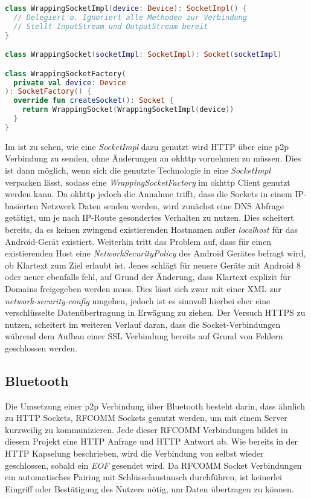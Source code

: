         \begin{lstlisting}[frame=bt, label={lst:android:socketfactory}, language=Kotlin, caption=HTTP Kapselung als SocketFactory (Clientcode in Kotlin)]
class WrappingSocketImpl(device: Device): SocketImpl() {
  // Delegiert o. Ignoriert alle Methoden zur Verbindung
  // Stellt InputStream und OutputStream bereit
}

class WrappingSocket(socketImpl: SocketImpl): Socket(socketImpl)

class WrappingSocketFactory(
  private val device: Device
): SocketFactory() {
  override fun createSocket(): Socket {
    return WrappingSocket(WrappingSocketImpl(device))
  }
}
        \end{lstlisting}
        Im  ist zu sehen, wie eine {\it SocketImpl} dazu genutzt wird HTTP über eine p2p Verbindung zu senden, ohne Änderungen an okhttp vornehmen zu müssen. Dies ist dann möglich, wenn sich die genutzte Technologie in eine {\it SocketImpl} verpacken lässt, sodass eine {\it WrappingSocketFactory} im okhttp Client genutzt werden kann. Da okhttp jedoch die Annahme trifft, dass die Sockets in einem IP-basierten Netzwerk Daten senden werden, wird zunächst eine DNS Abfrage getätigt, um je nach IP-Route gesondertes Verhalten zu nutzen. Dies scheitert bereits, da es keinen zwingend existierenden Hostnamen außer {\it localhost} für das Android-Gerät existiert. Weiterhin tritt das Problem auf, dass für einen existierenden Host eine {\it NetworkSecurityPolicy} des Android Gerätes befragt wird, ob Klartext zum Ziel erlaubt ist. Jenes schlägt für neuere Geräte mit Android 8 oder neuer ebenfalls fehl, auf Grund der Änderung, dass Klartext explizit für Domains freigegeben werden muss. Dies lässt sich zwar mit einer XML zur {\it network-security-config} umgehen, jedoch ist es sinnvoll hierbei eher eine verschlüsselte Datenübertragung in Erwägung zu ziehen. Der Versuch HTTPS zu nutzen, scheitert im weiteren Verlauf daran, dass die Socket-Verbindungen während dem Aufbau einer SSL Verbindung bereits auf Grund von Fehlern geschlossen werden.
        
        \subsection{Bluetooth}
        Die Umsetzung einer p2p Verbindung über Bluetooth besteht darin, dass ähnlich zu HTTP Sockets, RFCOMM Sockets genutzt werden, um mit einem Server kurzweilig zu kommunizieren. Jede dieser RFCOMM Verbindungen bildet in diesem Projekt eine HTTP Anfrage und HTTP Antwort ab. Wie bereits in der HTTP Kapselung beschrieben, wird die Verbindung von selbst wieder geschlossen, sobald ein {\it EOF} gesendet wird. Da RFCOMM Socket Verbindungen ein automatisches Pairing mit Schlüsselaustausch durchführen, ist keinerlei Eingriff oder Bestätigung des Nutzers nötig, um Daten übertragen zu können.
        
